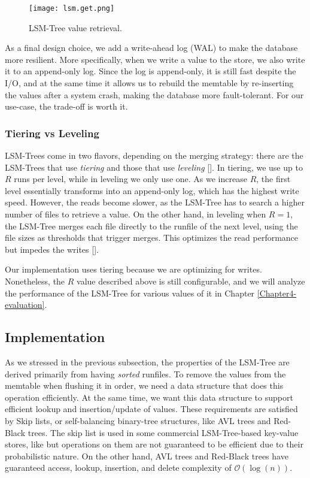 \begin{figure}[h]
    \centering
    \texttt{[image: lsm.get.png]}
    \caption{LSM-Tree value retrieval.}
    \label{fig:lsm.get}
\end{figure}


As a final design choice, we add a write-ahead log (WAL) to make the database more resilient. More specifically, when we write a value to the store, we also write it to an append-only log. Since the log is append-only, it is still fast despite the I/O, and at the same time it allows us to rebuild the memtable by re-inserting the values after a system crash, making the database more fault-tolerant. For our use-case, the trade-off is worth it.

\subsubsection{Tiering vs Leveling}

LSM-Trees come in two flavors, depending on the merging strategy: there are the LSM-Trees that use \textit{tiering} and those that use \textit{leveling} [\cite{compactionary}]. In tiering, we use up to $R$ runs per level, while in leveling we only use one.
As we increase $R$, the first level essentially transforms into an append-only log, which has the highest write speed. However, the reads become slower, as the LSM-Tree has to search a higher number of files to retrieve a value. On the other hand, in leveling when $R=1$, the LSM-Tree merges each file directly to the runfile of the next level, using the file sizes as thresholds that trigger merges. This optimizes the read performance but impedes the writes [\cite{lsm-design-space}].

Our implementation uses tiering because we are optimizing for writes. Nonetheless, the $R$ value described above is still configurable, and we will analyze the performance of the LSM-Tree for various values of it in Chapter \ref{Chapter4-evaluation}.

\subsection{Implementation}

As we stressed in the previous subsection, the properties of the LSM-Tree are derived primarily from having \textit{sorted} runfiles.
To remove the values from the memtable when flushing it in order, we need a data structure that does this operation efficiently.
At the same time, we want this data structure to support efficient lookup and insertion/update of values.
These requirements are satisfied by Skip lists, or self-balancing binary-tree structures, like AVL trees and Red-Black trees. The skip list is used in some commercial LSM-Tree-based key-value stores, like \cite{leveldb} but operations on them are not guaranteed to be efficient due to their probabilistic nature. On the other hand, AVL trees and Red-Black trees have guaranteed access, lookup, insertion, and delete complexity of $\mathcal{O}(\log{}(n))$.

